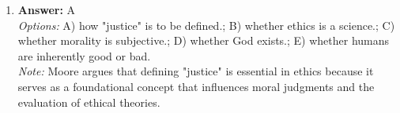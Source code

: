 \documentclass[12pt]{article}
\begin{document}
\begin{enumerate}[label=\arabic*.]
\\ \textit{Note:} The concept of an eternal and merciful deity reflects the deep-rooted spiritual beliefs in Japanese culture, particularly within Shinto and Buddhist traditions, emphasizing the importance of worship and connection to the divine in shaping moral and philosophical values.
\item \textbf{Answer:} A
\\ \textit{Options:} A) how "justice" is to be defined.; B) whether ethics is a science.; C) whether morality is subjective.; D) whether God exists.; E) whether humans are inherently good or bad.
\\ \textit{Note:} Moore argues that defining "justice" is essential in ethics because it serves as a foundational concept that influences moral judgments and the evaluation of ethical theories.
\end{enumerate}
\end{document}
